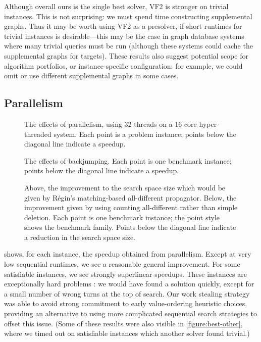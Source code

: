 \documentclass{llncs}
\begin{document}
Although overall ours is the single best solver, VF2 is stronger on trivial instances. This is not
surprising: we must spend time constructing supplemental graphs. Thus it may be worth using VF2 as a
presolver, if short runtimes for trivial instances is desirable---this may be the case in graph
database systems where many trivial queries must be run \cite{Giugno:2013} (although these systems
could cache the supplemental graphs for targets). These results also suggest potential scope for
algorithm portfolios, or instance-specific configuration: for example, we could omit or use
different supplemental graphs in some cases.

\subsection{Parallelism}

\begin{figure}[p]
    \centering
    

    \caption{The effects of parallelism, using 32 threads on a 16 core hyper-threaded
    system.  Each point is a problem instance; points below the diagonal line indicate a speedup.}
    \label{figure:speedup}
\end{figure}

\begin{figure}[p]
    \centering
    

    \caption{The effects of backjumping. Each point is one benchmark instance; points below the
    diagonal line indicate a speedup.}
    \label{figure:bj}
\end{figure}

\begin{figure}[p]
    \centering
    

    \caption{Above, the improvement to the search space size which would be given by R\'egin's
    matching-based all-different propagator. Below, the improvement given by using counting
    all-different rather than simple deletion. Each point is one benchmark instance; the point style
    shows the benchmark family. Points below the diagonal line indicate a reduction in the search space
    size.}
    \label{figure:fad}
\end{figure}

 shows, for each instance, the speedup obtained from parallelism. Except at
very low sequential runtimes, we see a reasonable general improvement.  For some satisfiable
instances, we see strongly superlinear speedups. These instances are exceptionally hard problems
\cite{Smith:1997}: we would have found a solution quickly, except for a small number of wrong turns
at the top of search. Our work stealing strategy was able to avoid strong commitment to early
value-ordering heuristic choices, providing an alternative to using more complicated sequential
search strategies to offset this issue. (Some of these results were also visible in
\cref{figure:best-other}, where we timed out on satisfiable instances which another solver found
trivial.)
\end{document}

